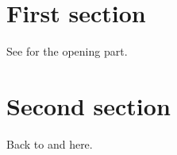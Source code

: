 \documentclass{article}
\begin{document}
\section{First section}
See  for the opening part.
\section{Second section}
Back to  and  here.
\end{document}
